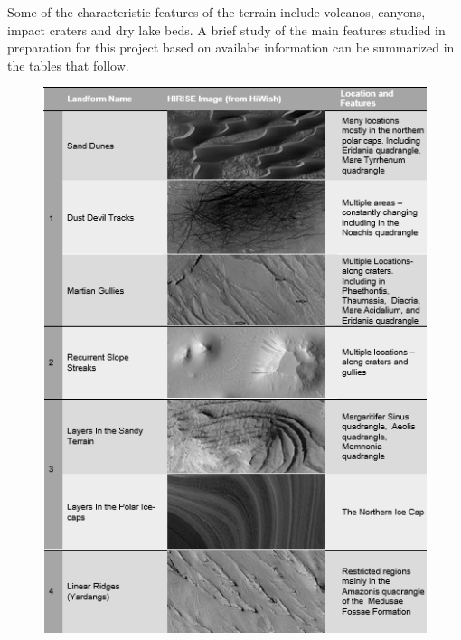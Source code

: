 \documentclass[project-plan]{report-template}
\begin{document}
 Some of the characteristic features of the terrain include volcanos, canyons, impact craters and dry lake beds. A brief study of the main features studied in preparation for this project based on availabe information can be summarized in the tables that follow. \\

 \begin{figure}[htp]
    \begin{center}
        \includegraphics[width=1\textwidth]{table-1-part-1.png}
    \end{center}
\end{figure}
\end{document}
